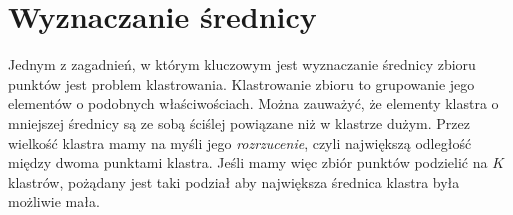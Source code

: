 \chapter{Wyznaczanie średnicy}
Jednym z zagadnień, w którym kluczowym jest wyznaczanie średnicy
zbioru punktów jest problem klastrowania. Klastrowanie zbioru to
grupowanie jego elementów o podobnych właściwościach. Można zauważyć,
że elementy klastra o mniejszej średnicy są ze sobą ściślej powiązane
niż w klastrze dużym. Przez wielkość klastra mamy na myśli jego
\emph{rozrzucenie}, czyli największą odległość między dwoma punktami
klastra. Jeśli mamy więc zbiór punktów podzielić na $K$ klastrów,
pożądany jest taki podział aby największa średnica klastra była
możliwie mała.

